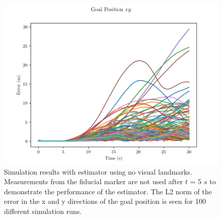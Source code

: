 \begin{figure}
  \centering
  \includegraphics[scale=0.5]{plots/mc_no_lms_xy_err.png}
  \caption{Simulation results with estimator using no visual
  landmarks. Measurements from the fiducial marker are not used after $t$ = 5
$s$ to demonstrate the performance of the estimator. The L2 norm of the error in
the x and y directions of the goal position is seen for 100 different simulation
runs.}
  \label{fig:mc_no_lms_xy_err}
\end{figure}
